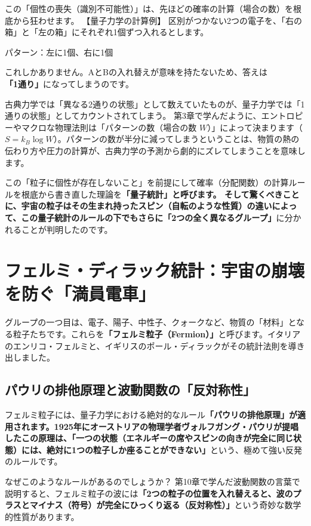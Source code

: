 この「個性の喪失（識別不可能性）」は、先ほどの確率の計算（場合の数）を根底から狂わせます。 【量子力学の計算例】 区別がつかない2つの電子を、「右の箱」と「左の箱」にそれぞれ1個ずつ入れるとします。

パターン：左に1個、右に1個

これしかありません。AとBの入れ替えが意味を持たないため、答えは\textbf{「1通り」}になってしまうのです。

古典力学では「異なる2通りの状態」として数えていたものが、量子力学では「1通りの状態」としてカウントされてしまう。 第3章で学んだように、エントロピーやマクロな物理法則は「パターンの数（場合の数 \(W\)）」によって決まります（\(S = k_B \log W\)）。パターンの数が半分に減ってしまうということは、物質の熱の伝わり方や圧力の計算が、古典力学の予測から劇的にズレてしまうことを意味します。

この「粒子に個性が存在しないこと」を前提にして確率（分配関数）の計算ルールを根底から書き直した理論を\textbf{「量子統計」と呼びます。 そして驚くべきことに、宇宙の粒子はその生まれ持ったスピン（自転のような性質）の違いによって、この量子統計のルールの下でもさらに「2つの全く異なるグループ」}に分かれることが判明したのです。

\section{フェルミ・ディラック統計：宇宙の崩壊を防ぐ「満員電車」}

グループの一つ目は、電子、陽子、中性子、クォークなど、物質の「材料」となる粒子たちです。これらを\textbf{「フェルミ粒子（Fermion）」}と呼びます。イタリアのエンリコ・フェルミと、イギリスのポール・ディラックがその統計法則を導き出しました。

\subsection{パウリの排他原理と波動関数の「反対称性」}

フェルミ粒子には、量子力学における絶対的なルール\textbf{「パウリの排他原理」が適用されます。1925年にオーストリアの物理学者ヴォルフガング・パウリが提唱したこの原理は、「一つの状態（エネルギーの席やスピンの向きが完全に同じ状態）には、絶対に1つの粒子しか座ることができない」}という、極めて強い反発のルールです。

なぜこのようなルールがあるのでしょうか？ 第10章で学んだ波動関数の言葉で説明すると、フェルミ粒子の波には\textbf{「2つの粒子の位置を入れ替えると、波のプラスとマイナス（符号）が完全にひっくり返る（反対称性）」}という奇妙な数学的性質があります。

